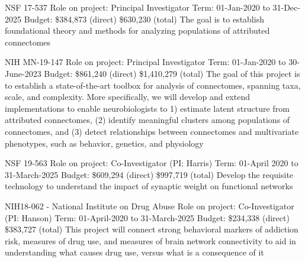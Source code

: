 \documentclass[10pt,colorlinks=true,urlcolor=blue]{moderncv}
\begin{document}
{\newline NSF 17-537
\newline Role on project: Principal Investigator
\newline Term: 01-Jan-2020 to 31-Dec-2025
\newline Budget: \$384,873 (direct) \$630,230 (total)
\newline The goal is to establish foundational theory and methods for analyzing populations of
attributed connectomes}{}{}{}{}

{\newline NIH MN-19-147
\newline Role on project: Principal Investigator
\newline Term: 01-Jan-2020 to 30-June-2023
\newline Budget: \$861,240 (direct) \$1,410,279 (total)
\newline The goal of this project is to establish a state-of-the-art toolbox for analysis of
connectomes, spanning taxa, scale, and complexity. More specifically, we will develop and
extend implementations to enable neurobiologists to 1) estimate latent structure from
attributed connectomes, (2) identify meaningful clusters among populations of
connectomes, and (3) detect relationships between connectomes and multivariate
phenotypes, such as behavior, genetics, and physiology}{}{}{}{}

{\newline NSF 19-563
\newline Role on project: Co-Investigator (PI: Harris)
\newline Term: 01-April 2020 to 31-March-2025
\newline Budget: \$609,294 (direct) \$997,719 (total)
\newline Develop the requisite technology to understand the impact of synaptic weight on functional
networks}{}{}{}{}

{\newline NIH18-062 - National Institute on Drug Abuse
\newline Role on project: Co-Investigator (PI: Hanson)
\newline Term: 01-April-2020 to 31-March-2025
\newline Budget: \$234,338 (direct) \$383,727 (total)
\newline This project will connect strong behavioral markers of addiction risk, measures of drug use,
and measures of brain network connectivity to aid in understanding what causes drug use,
versus what is a consequence of it}{}{}{}{}
\end{document}
